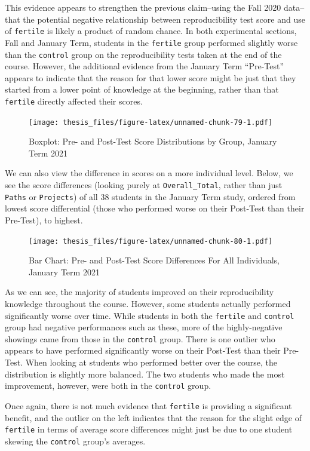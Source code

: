 \documentclass[12pt,twoside]{reedthesis}
\begin{document}
This evidence appears to strengthen the previous claim--using the Fall 2020 data--that the potential negative relationship between reproducibility test score and use of \texttt{fertile} is likely a product of random chance. In both experimental sections, Fall and January Term, students in the \texttt{fertile} group performed slightly worse than the \texttt{control} group on the reproducibility tests taken at the end of the course. However, the additional evidence from the January Term ``Pre-Test'' appears to indicate that the reason for that lower score might be just that they started from a lower point of knowledge at the beginning, rather than that \texttt{fertile} directly affected their scores.
\begin{figure}
\centering
\texttt{[image: thesis\_files/figure-latex/unnamed-chunk-79-1.pdf]}
\caption{\label{fig:unnamed-chunk-79}Boxplot: Pre- and Post-Test Score Distributions by Group, January Term 2021}
\end{figure}
We can also view the difference in scores on a more individual level. Below, we see the score differences (looking purely at \texttt{Overall\_Total}, rather than just \texttt{Paths} or \texttt{Projects}) of all 38 students in the January Term study, ordered from lowest score differential (those who performed worse on their Post-Test than their Pre-Test), to highest.
\begin{figure}
\centering
\texttt{[image: thesis\_files/figure-latex/unnamed-chunk-80-1.pdf]}
\caption{\label{fig:unnamed-chunk-80}Bar Chart: Pre- and Post-Test Score Differences For All Individuals, January Term 2021}
\end{figure}
As we can see, the majority of students improved on their reproducibility knowledge throughout the course. However, some students actually performed significantly worse over time. While students in both the \texttt{fertile} and \texttt{control} group had negative performances such as these, more of the highly-negative showings came from those in the \texttt{control} group. There is one outlier who appears to have performed significantly worse on their Post-Test than their Pre-Test. When looking at students who performed better over the course, the distribution is slightly more balanced. The two students who made the most improvement, however, were both in the \texttt{control} group.

Once again, there is not much evidence that \texttt{fertile} is providing a significant benefit, and the outlier on the left indicates that the reason for the slight edge of \texttt{fertile} in terms of average score differences might just be due to one student skewing the \texttt{control} group's averages.
\end{document}
